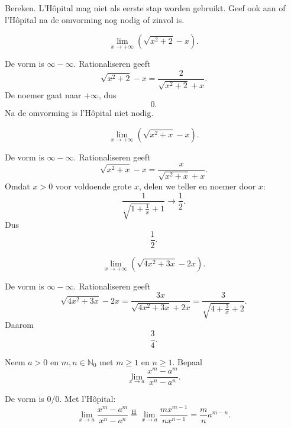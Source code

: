 \documentclass{ximera}
\begin{document}
\begin{oefening}{\oefU\ESS}

Bereken. L'Hôpital mag niet als eerste stap worden gebruikt. Geef ook
aan of l'Hôpital na de omvorming nog nodig of zinvol is.

\begin{question}
\[\lim_{x\to+\infty}\left(\sqrt{x^2+2}-x\right).\]

\begin{oplossing}
De vorm is \(\infty-\infty\). Rationaliseren geeft
\[\sqrt{x^2+2}-x=\frac2{\sqrt{x^2+2}+x}.\]
De noemer gaat naar \(+\infty\), dus
\[\boxed{0}.\]
Na de omvorming is l'Hôpital niet nodig.
\end{oplossing}
\end{question}

\begin{question}
\[\lim_{x\to+\infty}\left(\sqrt{x^2+x}-x\right).\]

\begin{oplossing}
De vorm is \(\infty-\infty\). Rationaliseren geeft
\[\sqrt{x^2+x}-x=\frac{x}{\sqrt{x^2+x}+x}.\]
Omdat \(x>0\) voor voldoende grote \(x\), delen we teller en noemer door
\(x\):
\[\frac1{\sqrt{1+\frac1x}+1}\longrightarrow\frac12.\]
Dus
\[\boxed{\frac12}.\]
\end{oplossing}
\end{question}

\begin{question}
\[\lim_{x\to+\infty}\left(\sqrt{4x^2+3x}-2x\right).\]

\begin{oplossing}
De vorm is \(\infty-\infty\). Rationaliseren geeft
\[
\sqrt{4x^2+3x}-2x
=\frac{3x}{\sqrt{4x^2+3x}+2x}
=\frac3{\sqrt{4+\frac3x}+2}.
\]
Daarom
\[\boxed{\frac34}.\]
\end{oplossing}
\end{question}
\end{oefening}

\begin{oefening}[Parameterlimiet]{\oefU\ESS}

Neem \(a>0\) en \(m,n\in\mathbb{N}_0\) met \(m\geq1\) en \(n\geq1\).
Bepaal
\[\lim_{x\to a}\frac{x^m-a^m}{x^n-a^n}.\]

\begin{oplossing}
De vorm is \(0/0\). Met l'Hôpital:
\[
\lim_{x\to a}\frac{x^m-a^m}{x^n-a^n}
\overset{\mathrm H}{=}
\lim_{x\to a}\frac{mx^{m-1}}{nx^{n-1}}
=\boxed{\frac mn a^{m-n}}.
\]
\end{oplossing}
\end{oefening}
\end{document}
